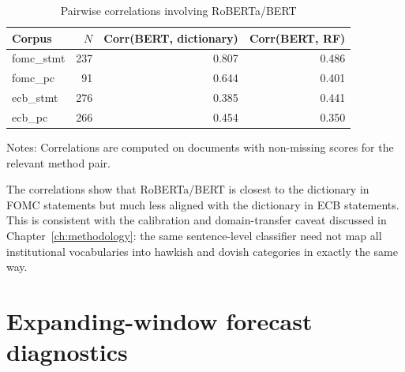 \begin{table}[H]
\centering
\caption{Pairwise correlations involving RoBERTa\slash BERT}
\label{tab:a3_bert_correlations}
\begin{threeparttable}
\small

\begin{tabular}{lrrr}
\toprule
Corpus & $N$ & Corr(BERT, dictionary) & Corr(BERT, RF) \\
\midrule
fomc\_stmt & 237 & 0.807 & 0.486 \\
fomc\_pc & 91 & 0.644 & 0.401 \\
ecb\_stmt & 276 & 0.385 & 0.441 \\
ecb\_pc & 266 & 0.454 & 0.350 \\
\bottomrule
\end{tabular}

\begin{tablenotes}
\footnotesize
\item Notes: Correlations are computed on documents with non-missing scores for the relevant method pair.
\end{tablenotes}
\end{threeparttable}
\end{table}


The correlations show that RoBERTa\slash BERT is closest to the dictionary in FOMC
statements but much less aligned with the dictionary in ECB statements. This is consistent with the calibration and domain-transfer caveat discussed
in Chapter~\ref{ch:methodology}: the same sentence-level classifier need not map
all institutional vocabularies into hawkish and dovish categories in exactly the
same way.

\section{Expanding-window forecast diagnostics}
\label{app:a3_xw_forecasts}


